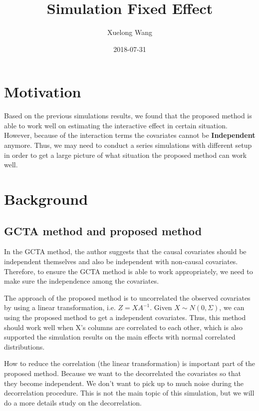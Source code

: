 \documentclass[]{article}
\title{Simulation Fixed Effect}
\author{Xuelong Wang}
\date{2018-07-31}
\begin{document}
\maketitle

{
\setcounter{tocdepth}{2}
\tableofcontents
}
\section{Motivation}\label{motivation}

Based on the previous simulations results, we found that the proposed
method is able to work well on estimating the interactive effect in
certain situation. However, because of the interaction terms the
covariates cannot be \textbf{Independent} anymore. Thus, we may need to
conduct a series simulations with different setup in order to get a
large picture of what situation the proposed method can work well.

\section{Background}\label{background}

\subsection{GCTA method and proposed
method}\label{gcta-method-and-proposed-method}

In the GCTA method, the author suggests that the causal covariates
should be independent themselves and also be independent with non-causal
covariates. Therefore, to ensure the GCTA method is able to work
appropriately, we need to make sure the independence among the
covariates.

The approach of the proposed method is to uncorrelated the observed
covariates by using a linear transformation, i.e. \(Z = XA^{-1}\). Given
\(X \sim N(0, \Sigma)\), we can using the proposed method to get a
independent covariates. Thus, this method should work well when X's
columns are correlated to each other, which is also supported the
simulation results on the main effects with normal correlated
distributions.

How to reduce the correlation (the linear transformation) is important
part of the proposed method. Because we want to the decorrelated the
covariates so that they become independent. We don't want to pick up to
much noise during the decorrelation procedure. This is not the main
topic of this simulation, but we will do a more details study on the
decorrelation.
\end{document}
